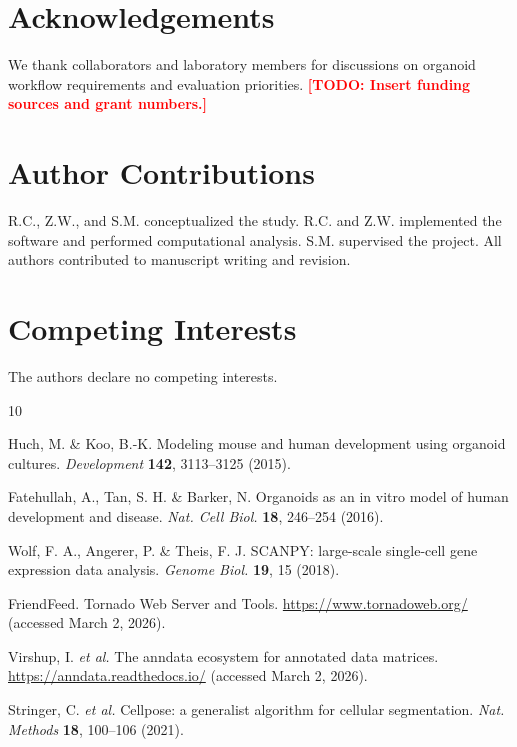 \documentclass[11pt]{article}
\newcommand{\todoitem}[1]{\textcolor{red}{\textbf{[TODO: #1]}}}
\begin{document}
\section{Acknowledgements}
We thank collaborators and laboratory members for discussions on organoid workflow requirements and evaluation priorities.
\todoitem{Insert funding sources and grant numbers.}

\section{Author Contributions}
R.C., Z.W., and S.M. conceptualized the study. R.C. and Z.W. implemented the software and performed computational analysis. S.M. supervised the project. All authors contributed to manuscript writing and revision.

\section{Competing Interests}
The authors declare no competing interests.

\begin{thebibliography}{10}

Huch, M. \& Koo, B.-K. Modeling mouse and human development using organoid cultures. \textit{Development} \textbf{142}, 3113--3125 (2015).

Fatehullah, A., Tan, S. H. \& Barker, N. Organoids as an in vitro model of human development and disease. \textit{Nat. Cell Biol.} \textbf{18}, 246--254 (2016).

Wolf, F. A., Angerer, P. \& Theis, F. J. SCANPY: large-scale single-cell gene expression data analysis. \textit{Genome Biol.} \textbf{19}, 15 (2018).

FriendFeed. Tornado Web Server and Tools.
\url{https://www.tornadoweb.org/} (accessed March 2, 2026).

Virshup, I. \textit{et al.} The anndata ecosystem for annotated data matrices.
\url{https://anndata.readthedocs.io/} (accessed March 2, 2026).

Stringer, C. \textit{et al.} Cellpose: a generalist algorithm for cellular segmentation. \textit{Nat. Methods} \textbf{18}, 100--106 (2021).

\end{thebibliography}
\end{document}
